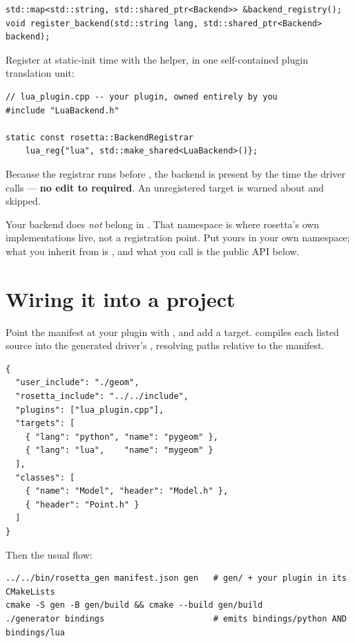 \begin{lstlisting}[style=cpp]
std::map<std::string, std::shared_ptr<Backend>> &backend_registry();
void register_backend(std::string lang, std::shared_ptr<Backend> backend);
\end{lstlisting}

Register at static-init time with the  helper, in one
self-contained plugin translation unit:

\begin{lstlisting}[style=cpp]
// lua_plugin.cpp -- your plugin, owned entirely by you
#include "LuaBackend.h"

static const rosetta::BackendRegistrar
    lua_reg{"lua", std::make_shared<LuaBackend>()};
\end{lstlisting}

Because the registrar runs before , the  backend is
present by the time the driver calls  --- \textbf{no edit to
 required}. An unregistered target is warned about and skipped.

\begin{note}
Your backend does \emph{not} belong in . That namespace
is where rosetta's own implementations live, not a registration point. Put
yours in your own namespace; what you inherit from is ,
and what you call is the public API below.
\end{note}

\section{Wiring it into a project}

Point the manifest at your plugin with , and add a target.
 compiles each listed source into the generated driver's
, resolving paths relative to the manifest.

\begin{lstlisting}[style=json]
{
  "user_include": "./geom",
  "rosetta_include": "../../include",
  "plugins": ["lua_plugin.cpp"],
  "targets": [
    { "lang": "python", "name": "pygeom" },
    { "lang": "lua",    "name": "mygeom" }
  ],
  "classes": [
    { "name": "Model", "header": "Model.h" },
    { "header": "Point.h" }
  ]
}
\end{lstlisting}

Then the usual flow:

\begin{lstlisting}[style=sh]
../../bin/rosetta_gen manifest.json gen   # gen/ + your plugin in its CMakeLists
cmake -S gen -B gen/build && cmake --build gen/build
./generator bindings                      # emits bindings/python AND bindings/lua
\end{lstlisting}


